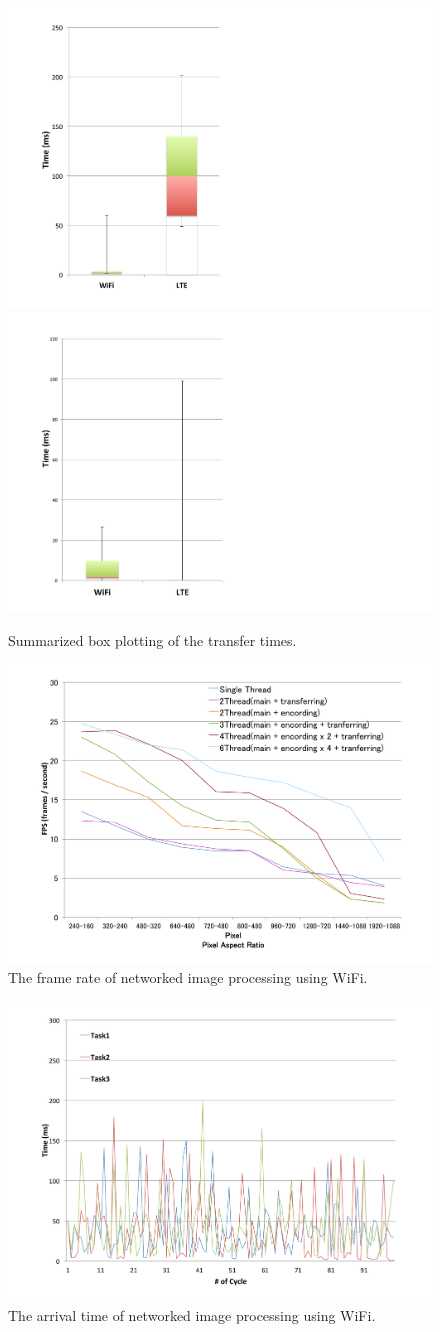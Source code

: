 \begin{figure}[!t]
 \centering
 \includegraphics[width=0.45\hsize]{fig/No3_Andrive_boxplot_compare_WiFi_and_LTE.pdf}
 \includegraphics[width=0.45\hsize]{fig/No7_Andrive_only_send_boxplot_compare_WiFi_and_LTE.pdf}
 \caption{Summarized box plotting of the transfer times.}
 \label{fig:no3_7}
\end{figure}

\begin{figure}[!t]
 \centering
 \includegraphics[width=0.8\hsize]{fig/No8_TIPiC_FPS_graph_WiFi.pdf}
 \caption{The frame rate of networked image processing using WiFi.}
 \label{fig:no8}
\end{figure}

\begin{figure}[!t]
 \centering
 \includegraphics[width=0.8\hsize]{fig/No9_TIPiC_serv_cycle_WiFi.pdf}
 \caption{The arrival time of networked image processing using WiFi.}
 \label{fig:no9}
\end{figure}

